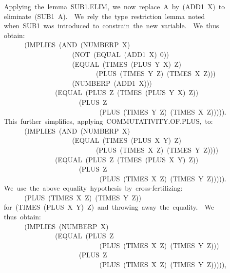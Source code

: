 \documentclass[11pt]{book}
\newenvironment{pubasis}{\begin{flushleft}\ttfamily\small}{\normalsize\rmfamily\end{flushleft}}
\begin{document}
\begin{pubasis}
~~~~Applying~the~lemma~SUB1.ELIM,~we~now~replace~A~by~(ADD1~X)~to\\
~~~~eliminate~(SUB1~A).~~We~rely~the~type~restriction~lemma~noted\\
~~~~when~SUB1~was~introduced~to~constrain~the~new~variable.~~We~thus\\
~~~~obtain:\\

~~~~~~~~~~(IMPLIES~(AND~(NUMBERP~X)\\
~~~~~~~~~~~~~~~~~~~~~~~~(NOT~(EQUAL~(ADD1~X)~0))\\
~~~~~~~~~~~~~~~~~~~~~~~~(EQUAL~(TIMES~(PLUS~Y~X)~Z)\\
~~~~~~~~~~~~~~~~~~~~~~~~~~~~~~~(PLUS~(TIMES~Y~Z)~(TIMES~X~Z)))\\
~~~~~~~~~~~~~~~~~~~~~~~~(NUMBERP~(ADD1~X)))\\
~~~~~~~~~~~~~~~~~~~(EQUAL~(PLUS~Z~(TIMES~(PLUS~Y~X)~Z))\\
~~~~~~~~~~~~~~~~~~~~~~~~~~(PLUS~Z\\
~~~~~~~~~~~~~~~~~~~~~~~~~~~~~~~~(PLUS~(TIMES~Y~Z)~(TIMES~X~Z))))).\\

~~~~This~further~simplifies,~applying~COM\-MU\-TA\-TIV\-ITY.OF.PLUS,~to:\\

~~~~~~~~~~(IMPLIES~(AND~(NUMBERP~X)\\
~~~~~~~~~~~~~~~~~~~~~~~~(EQUAL~(TIMES~(PLUS~X~Y)~Z)\\
~~~~~~~~~~~~~~~~~~~~~~~~~~~~~~~(PLUS~(TIMES~X~Z)~(TIMES~Y~Z))))\\
~~~~~~~~~~~~~~~~~~~(EQUAL~(PLUS~Z~(TIMES~(PLUS~X~Y)~Z))\\
~~~~~~~~~~~~~~~~~~~~~~~~~~(PLUS~Z\\
~~~~~~~~~~~~~~~~~~~~~~~~~~~~~~~~(PLUS~(TIMES~X~Z)~(TIMES~Y~Z))))).\\

~~~~We~use~the~above~equality~hypothesis~by~cross-fertilizing:\\
~~~~~~~~~~(PLUS~(TIMES~X~Z)~(TIMES~Y~Z))\\
~~~~for~(TIMES~(PLUS~X~Y)~Z)~and~throwing~away~the~equality.~~We\\
~~~~thus~obtain:\\

~~~~~~~~~~(IMPLIES~(NUMBERP~X)\\
~~~~~~~~~~~~~~~~~~~(EQUAL~(PLUS~Z\\
~~~~~~~~~~~~~~~~~~~~~~~~~~~~~~~~(PLUS~(TIMES~X~Z)~(TIMES~Y~Z)))\\
~~~~~~~~~~~~~~~~~~~~~~~~~~(PLUS~Z\\
~~~~~~~~~~~~~~~~~~~~~~~~~~~~~~~~(PLUS~(TIMES~X~Z)~(TIMES~Y~Z))))),\\


\end{pubasis}
\end{document}
